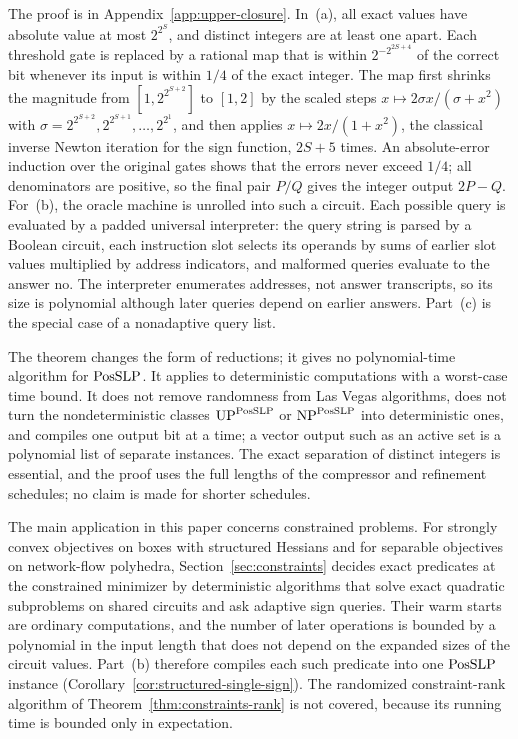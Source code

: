 The proof is in Appendix~\ref{app:upper-closure}. In~(a), all exact values
have absolute value at most $2^{2^S}$, and distinct integers are at least
one apart. Each threshold gate is replaced by a rational map that is within
$2^{-2^{2S+4}}$ of the correct bit whenever its input is within $1/4$ of the
exact integer. The map first shrinks the magnitude from $[1,2^{2^{S+2}}]$ to
$[1,2]$ by the scaled steps $x\mapsto2\sigma x/(\sigma+x^2)$ with
$\sigma=2^{2^{S+2}},2^{2^{S+1}},\ldots,2^{2^1}$, and then applies
$x\mapsto2x/(1+x^2)$, the classical inverse Newton iteration for the sign
function, $2S+5$ times. An absolute-error induction over the original gates
shows that the errors never exceed $1/4$; all denominators are positive, so
the final pair $P/Q$ gives the integer output $2P-Q$. For~(b), the oracle
machine is unrolled into such a circuit. Each possible query is evaluated by
a padded universal interpreter: the query string is parsed by a Boolean
circuit, each instruction slot selects its operands by sums of earlier slot
values multiplied by address indicators, and malformed queries evaluate to
the answer no. The interpreter enumerates addresses, not answer transcripts,
so its size is polynomial although later queries depend on earlier answers.
Part~(c) is the special case of a nonadaptive query list.

The theorem changes the form of reductions; it gives no polynomial-time
algorithm for $\mathrm{PosSLP}$. It applies to deterministic computations with a
worst-case time bound. It does not remove randomness from Las Vegas
algorithms, does not turn the nondeterministic classes
$\mathrm{UP}^{\mathrm{PosSLP}}$ or $\mathrm{NP}^{\mathrm{PosSLP}}$ into deterministic ones,
and compiles one output bit at a time; a vector output such as an active set
is a polynomial list of separate instances. The exact separation of distinct
integers is essential, and the proof uses the full lengths of the compressor
and refinement schedules; no claim is made for shorter schedules.

The main application in this paper concerns constrained problems. For
strongly convex objectives on boxes with structured Hessians and for
separable objectives on network-flow polyhedra, Section~\ref{sec:constraints}
decides exact predicates at the constrained minimizer by deterministic
algorithms that solve exact quadratic subproblems on shared circuits and ask
adaptive sign queries. Their warm starts are ordinary computations, and the
number of later operations is bounded by a polynomial in the input length
that does not depend on the expanded sizes of the circuit values. Part~(b)
therefore compiles each such predicate into one $\mathrm{PosSLP}$ instance
(Corollary~\ref{cor:structured-single-sign}). The randomized
constraint-rank algorithm of Theorem~\ref{thm:constraints-rank} is not
covered, because its running time is bounded only in expectation.

